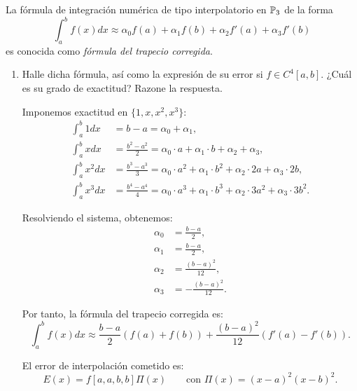\begin{ejercicio}\label{ej:2.1.16}
    La fórmula de integración numérica de tipo interpolatorio en $\mathbb{P}_3$ de la forma
    \begin{equation*}
        \int_{a}^{b} f(x) dx \approx \alpha_0 f(a) + \alpha_1 f(b) + \alpha_2 f'(a) + \alpha_3 f'(b)
    \end{equation*}
    es conocida como \emph{fórmula del trapecio corregida}.
    \begin{enumerate}
        \item Halle dicha fórmula, así como la expresión de su error si $f \in C^4[a, b]$. ¿Cuál es su grado de exactitud? Razone la respuesta.
        
        Imponemos exactitud en $\{1,x,x^2,x^3\}$:
        \begin{align*}
            \int_{a}^{b} 1 dx &= b - a = \alpha_0 + \alpha_1,\\
            \int_{a}^{b} x dx &= \frac{b^2 - a^2}{2} = \alpha_0\cdot a + \alpha_1\cdot b + \alpha_2 + \alpha_3,\\
            \int_{a}^{b} x^2 dx &= \frac{b^3 - a^3}{3} = \alpha_0\cdot a^2 + \alpha_1\cdot b^2 + \alpha_2\cdot 2a + \alpha_3\cdot 2b,\\
            \int_{a}^{b} x^3 dx &= \frac{b^4 - a^4}{4} = \alpha_0\cdot a^3 + \alpha_1\cdot b^3 + \alpha_2\cdot 3a^2 + \alpha_3\cdot 3b^2.
        \end{align*}

        Resolviendo el sistema, obtenemos:
        \begin{align*}
            \alpha_0 &= \frac{b - a}{2},\\
            \alpha_1 &= \frac{b - a}{2},\\
            \alpha_2 &= \frac{(b - a)^2}{12},\\
            \alpha_3 &= -\frac{(b - a)^2}{12}.
        \end{align*}

        Por tanto, la fórmula del trapecio corregida es:
        \begin{equation*}
            \int_{a}^{b} f(x) dx \approx \frac{b - a}{2}\left( f(a) + f(b) \right) + \frac{(b - a)^2}{12}\left( f'(a) - f'(b) \right).
        \end{equation*}

        El error de interpolación cometido es:
        \begin{equation*}
            E(x) = f[a,a,b,b]\Pi(x)\qquad \text{con } \Pi(x) = (x - a)^2(x - b)^2.
        \end{equation*}


\end{enumerate}
\end{ejercicio}
